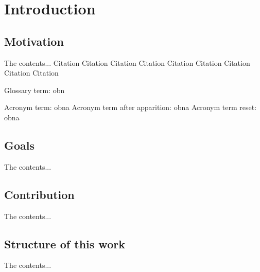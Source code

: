 %
%

\chapter{Introduction} %
\label{chap:introduction}

%
%

\section{Motivation}
The contents...
Citation \cite{bk:sbc2007}
Citation \citep{ds:aco2004}
Citation \citet{dmc:as1996}
Citation \citep{bbek:simul2011}
Citation \citep{rossum:lang1995}
Citation \citep{silva:ti2005}
Citation \citep{oliveira:master2005}
Citation \citep{Joe:COFFEE2000}
Citation \citep{COFFEE:2000}


Glossary term: \gls{obn} %

Acronym term: \gls{obna}
Acronym term after apparition: \gls{obna}
Acronym term reset: \gls{obna} %

%
%
\section{Goals}
The contents...

%
%
\section{Contribution}
The contents...

%
%

\section{Structure of this work}
The contents...